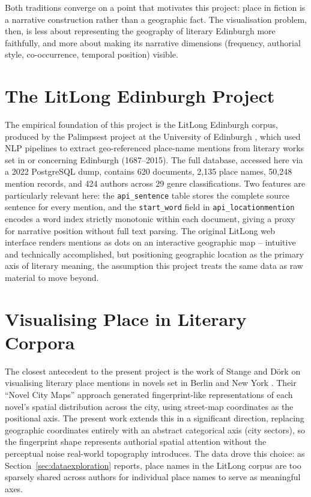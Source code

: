 \documentclass[logo,msc]{infthesis}
\begin{document}
Both traditions converge on a point that motivates this project: place in fiction is a narrative construction rather than a geographic fact. The visualisation problem, then, is less about representing the geography of literary Edinburgh more faithfully, and more about making its narrative dimensions (frequency, authorial style, co-occurrence, temporal position) visible.
 
\section{The LitLong Edinburgh Project}
 
The empirical foundation of this project is the LitLong Edinburgh corpus, produced by the Palimpsest project at the University of Edinburgh \cite{anderson2016}, which used NLP pipelines to extract geo-referenced place-name mentions from literary works set in or concerning Edinburgh (1687--2015). The full database, accessed here via a 2022 PostgreSQL dump, contains 620 documents, 2,135 place names, 50,248 mention records, and 424 authors across 29 genre classifications. Two features are particularly relevant here: the \texttt{api\_sentence} table stores the complete source sentence for every mention, and the \texttt{start\_word} field in \texttt{api\_locationmention} encodes a word index strictly monotonic within each document, giving a proxy for narrative position without full text parsing. The original LitLong web interface renders mentions as dots on an interactive geographic map -- intuitive and technically accomplished, but positioning geographic location as the primary axis of literary meaning, the assumption this project treats the same data as raw material to move beyond.
 
\section{Visualising Place in Literary Corpora}
 
The closest antecedent to the present project is the work of Stange and D{\"o}rk on visualising literary place mentions in novels set in Berlin and New York \cite{stange2015}. Their ``Novel City Maps'' approach generated fingerprint-like representations of each novel's spatial distribution across the city, using street-map coordinates as the positional axis. The present work extends this in a significant direction, replacing geographic coordinates entirely with an abstract categorical axis (city sectors), so the fingerprint shape represents authorial spatial attention without the perceptual noise real-world topography introduces. The data drove this choice: as Section~\ref{sec:dataexploration} reports, place names in the LitLong corpus are too sparsely shared across authors for individual place names to serve as meaningful axes.
 
\end{document}
